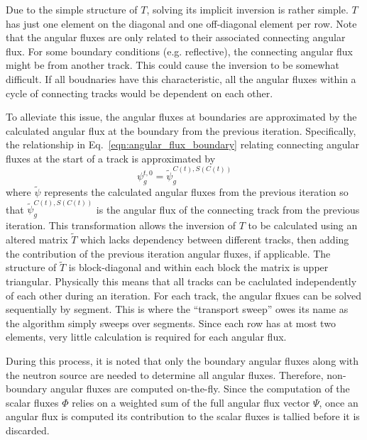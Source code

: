 Due to the simple structure of $T$, solving its implicit inversion is rather simple. $T$ has just one element on the diagonal and one off-diagonal element per row. Note that the angular fluxes are only related to their associated connecting angular flux. For some boundary conditions (e.g. reflective), the connecting angular flux might be from another track. This could cause the inversion to be somewhat difficult. If all boudnaries have this characteristic, all the angular fluxes within a cycle of connecting tracks would be dependent on each other.

To alleviate this issue, the angular fluxes at boundaries are approximated by the calculated angular flux at the boundary from the previous iteration. Specifically, the relationship in Eq.~\ref{eqn:angular_flux_boundary} relating connecting angular fluxes at the start of a track is approximated by
\begin{dmath}
	\psi_g^{t,0} = \widetilde{\psi}_g^{C(t),S(C(t))}
\end{dmath}
where $\widetilde{\psi}$ represents the calculated angular fluxes from the previous iteration so that $\widetilde{\psi}_g^{C(t),S(C(t))}$ is the angular flux of the connecting track from the previous iteration. This transformation allows the inversion of $T$ to be calculated using an altered matrix $\tilde{T}$ which lacks dependency between different tracks, then adding the contribution of the previous iteration angular fluxes, if applicable. The structure of $\tilde{T}$ is block-diagonal and within each block the matrix is upper triangular. Physically this means that all tracks can be caclulated independently of each other during an iteration. For each track, the angular flxues can be solved sequentially by segment. This is where the ``transport sweep'' owes its name as the algorithm simply sweeps over segments. Since each row has at most two elements, very little calculation is required for each angular flux. 

During this process, it is noted that only the boundary angular fluxes along with the neutron source are needed to determine all angular fluxes. Therefore, non-boundary angular fluxes are computed on-the-fly. Since the computation of the scalar fluxes $\Phi$ relies on a weighted sum of the full angular flux vector $\Psi$, once an angular flux is computed its contribution to the scalar fluxes is tallied before it is discarded.

